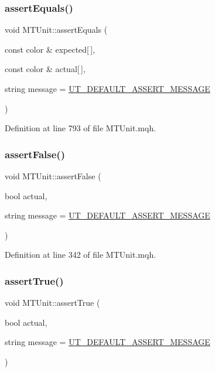 \subsubsection{\texorpdfstring{assert\+Equals()}{assertEquals()}\hspace{0.1cm}{\footnotesize\ttfamily [28/28]}}
{\footnotesize\ttfamily void M\+T\+Unit\+::assert\+Equals (\begin{DoxyParamCaption}\item[{const color \&}]{expected\mbox{[}$\,$\mbox{]},  }\item[{const color \&}]{actual\mbox{[}$\,$\mbox{]},  }\item[{string}]{message = {\ttfamily \mbox{\hyperlink{_m_t_unit_8mqh_a96f5d62188d09039ebc3f443c9120e39}{U\+T\+\_\+\+D\+E\+F\+A\+U\+L\+T\+\_\+\+A\+S\+S\+E\+R\+T\+\_\+\+M\+E\+S\+S\+A\+GE}}} }\end{DoxyParamCaption})}



Definition at line 793 of file M\+T\+Unit.\+mqh.

\mbox{\label{class_m_t_unit_a625a8575cf6eece310d1b4c1f252dff8}} 
\subsubsection{\texorpdfstring{assert\+False()}{assertFalse()}}
{\footnotesize\ttfamily void M\+T\+Unit\+::assert\+False (\begin{DoxyParamCaption}\item[{bool}]{actual,  }\item[{string}]{message = {\ttfamily \mbox{\hyperlink{_m_t_unit_8mqh_a96f5d62188d09039ebc3f443c9120e39}{U\+T\+\_\+\+D\+E\+F\+A\+U\+L\+T\+\_\+\+A\+S\+S\+E\+R\+T\+\_\+\+M\+E\+S\+S\+A\+GE}}} }\end{DoxyParamCaption})}



Definition at line 342 of file M\+T\+Unit.\+mqh.

\mbox{\label{class_m_t_unit_aa8c5564965a26d8e26a426595d3d2a13}} 
\subsubsection{\texorpdfstring{assert\+True()}{assertTrue()}}
{\footnotesize\ttfamily void M\+T\+Unit\+::assert\+True (\begin{DoxyParamCaption}\item[{bool}]{actual,  }\item[{string}]{message = {\ttfamily \mbox{\hyperlink{_m_t_unit_8mqh_a96f5d62188d09039ebc3f443c9120e39}{U\+T\+\_\+\+D\+E\+F\+A\+U\+L\+T\+\_\+\+A\+S\+S\+E\+R\+T\+\_\+\+M\+E\+S\+S\+A\+GE}}} }\end{DoxyParamCaption})}



